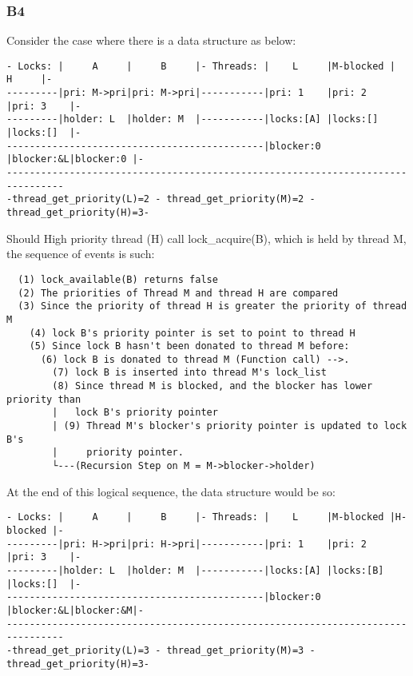 \documentclass[a4wide, 11pt]{article}
\begin{document}
\subsubsection{B4}
Consider the case where there is a data structure as below:

\begin{verbatim}
- Locks: |     A     |     B     |- Threads: |    L     |M-blocked |    H     |-
---------|pri: M->pri|pri: M->pri|-----------|pri: 1    |pri: 2    |pri: 3    |-
---------|holder: L  |holder: M  |-----------|locks:[A] |locks:[]  |locks:[]  |-
---------------------------------------------|blocker:0 |blocker:&L|blocker:0 |-
--------------------------------------------------------------------------------
-thread_get_priority(L)=2 - thread_get_priority(M)=2 - thread_get_priority(H)=3-
\end{verbatim}

Should High priority thread (H) call lock\_acquire(B), which is held by thread M, the sequence of events is such:
\begin{verbatim}
  (1) lock_available(B) returns false
  (2) The priorities of Thread M and thread H are compared
  (3) Since the priority of thread H is greater the priority of thread M
    (4) lock B's priority pointer is set to point to thread H
    (5) Since lock B hasn't been donated to thread M before:
      (6) lock B is donated to thread M (Function call) -->.
        (7) lock B is inserted into thread M's lock_list
        (8) Since thread M is blocked, and the blocker has lower priority than
        |   lock B's priority pointer
        | (9) Thread M's blocker's priority pointer is updated to lock B's 
        |     priority pointer.
        └---(Recursion Step on M = M->blocker->holder)
\end{verbatim}

At the end of this logical sequence, the data structure would be so:

\begin{verbatim}
- Locks: |     A     |     B     |- Threads: |    L     |M-blocked |H-blocked |-
---------|pri: H->pri|pri: H->pri|-----------|pri: 1    |pri: 2    |pri: 3    |-
---------|holder: L  |holder: M  |-----------|locks:[A] |locks:[B] |locks:[]  |-
---------------------------------------------|blocker:0 |blocker:&L|blocker:&M|-
--------------------------------------------------------------------------------
-thread_get_priority(L)=3 - thread_get_priority(M)=3 - thread_get_priority(H)=3-
\end{verbatim}
\end{document}
